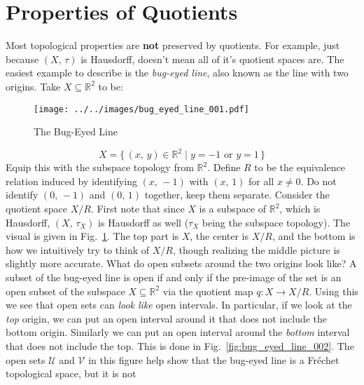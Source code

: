 \documentclass{article}
\theoremstyle{plain}
\theoremstyle{normal}
\begin{document}
    \section{Properties of Quotients}
        Most topological properties are \textbf{not} preserved by quotients.
        For example, just because $(X,\,\tau)$ is Hausdorff, doesn't mean all of
        it's quotient spaces are. The easiest example to describe is the
        \textit{bug-eyed line}, also known as the line with two origins.
        Take $X\subseteq\mathbb{R}^{2}$ to be:
        \begin{figure}
            \centering
            \texttt{[image: ../../images/bug\_eyed\_line\_001.pdf]}
            \caption{The Bug-Eyed Line}
            \label{fig:bug_eyed_line_001}
        \end{figure}
        \begin{equation}
            X=\{\,(x,\,y)\in\mathbb{R}^{2}\;|\;y=-1\textrm{ or }y=1\,\}
        \end{equation}
        Equip this with the subspace topology from $\mathbb{R}^{2}$.
        Define $R$ to be the equivalence relation induced by identifying
        $(x,\,-1)$ with $(x,\,1)$ for all $x\ne{0}$. Do not identify
        $(0,\,-1)$ and $(0,\,1)$ together, keep them separate. Consider the
        quotient space $X/R$. First note that since $X$ is a subspace of
        $\mathbb{R}^{2}$, which is Hausdorff, $(X,\,\tau_{X})$ is
        Hausdorff as well ($\tau_{X}$ being the subspace topology). The
        visual is given in Fig.~\ref{fig:bug_eyed_line_001}. The top part
        is $X$, the center is $X/R$, and the bottom is how we intuitively try
        to think of $X/R$, though realizing the middle picture is slightly
        more accurate. What do open subsets around the two origins look like?
        A subset of the bug-eyed line is open if and only if the pre-image of
        the set is an open subset of the subspace $X\subseteq\mathbb{R}^{2}$
        via the quotient map $q:X\rightarrow{X}/R$.
        Using this we see that open sets can \textit{look like} open intervals.
        In particular, if we look at the \textit{top} origin, we can put an
        open interval around it that does not include the bottom origin.
        Similarly we can put an open interval around the
        \textit{bottom} interval that does not include the top. This is done
        in Fig.~\ref{fig:bug_eyed_line_002}. The open sets
        $\mathcal{U}$ and $\mathcal{V}$ in this figure help show that
        the bug-eyed line is a Fr\'{e}chet topological space, but it is not
\end{document}
